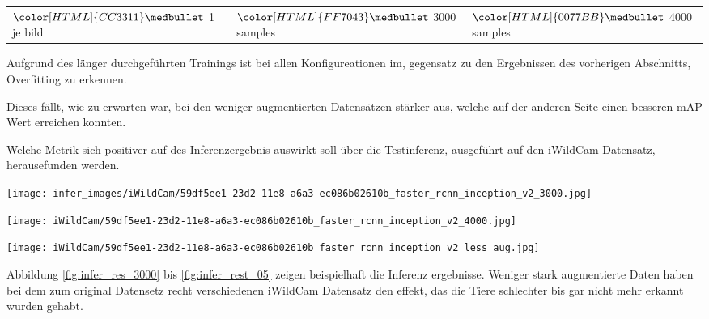 \begin{table}[htb]
  \centering
  \begin{tabular}{m{}<{\centering}m{}<{\centering}m{}<{\centering}}
    $\color[HTML]{CC3311}\medbullet$  1 je bild & $\color[HTML]{FF7043}\medbullet$  3000 samples & $\color[HTML]{0077BB}\medbullet$  4000 samples
  \end{tabular}    
\end{table}

Aufgrund des länger durchgeführten Trainings ist bei allen Konfigureationen
im, gegensatz zu den Ergebnissen des vorherigen Abschnitts, Overfitting 
zu erkennen.

Dieses fällt, wie zu erwarten war, bei den weniger  
augmentierten Datensätzen stärker aus, welche auf der 
anderen Seite einen besseren mAP Wert erreichen konnten.

Welche Metrik sich positiver auf des Inferenzergebnis auswirkt 
soll über die Testinferenz, ausgeführt 
auf den iWildCam Datensatz, herausefunden werden.


\vspace{1cm}
\begin{minipage}{0.333\textwidth}
  \centering
  \texttt{[image: infer\_images/iWildCam/59df5ee1-23d2-11e8-a6a3-ec086b02610b\_faster\_rcnn\_inception\_v2\_3000.jpg]}
  \label{fig:infer_res_3000}
\end{minipage}
\begin{minipage}{0.333\textwidth}
  \centering
  \label{fig:infer_res_4000}
  \texttt{[image: iWildCam/59df5ee1-23d2-11e8-a6a3-ec086b02610b\_faster\_rcnn\_inception\_v2\_4000.jpg]}
\end{minipage}
\begin{minipage}{0.333\textwidth}
  \centering
  \texttt{[image: iWildCam/59df5ee1-23d2-11e8-a6a3-ec086b02610b\_faster\_rcnn\_inception\_v2\_less\_aug.jpg]}
  \label{fig:infer_rest_05}
\end{minipage}
\vspace{1cm}

Abbildung \ref{fig:infer_res_3000} bis \ref{fig:infer_rest_05}
zeigen beispielhaft die Inferenz ergebnisse.
Weniger stark augmentierte Daten haben bei dem zum original 
Datensetz recht verschiedenen iWildCam Datensatz den effekt, 
das die Tiere schlechter bis gar nicht mehr erkannt wurden gehabt.





